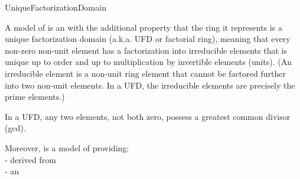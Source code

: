 \begin{ccRefConcept}{UniqueFactorizationDomain}


\ccDefinition


A model of  is an  with the additional property 
that the ring it represents is a unique factorization domain 
(a.k.a. UFD or factorial ring), meaning that every non-zero non-unit 
element has a factorization into irreducible elements that is unique 
up to order and up to multiplication by invertible elements (units). 
(An irreducible element is a non-unit ring element that cannot be factored 
further into two non-unit elements. In a UFD, the irreducible elements 
are precisely the prime elements.)

In a UFD, any two elements, not both zero, possess a greatest common 
divisor (gcd). 

Moreover,  is a model of 
 providing:\\
 
-  derived from  \\
-  an \\
  

 
\ccRefines
 
\ccSeeAlso

\\
\\
\\
\\
\\
\\
\\
\\
\\

\ccHasModels


\end{ccRefConcept}